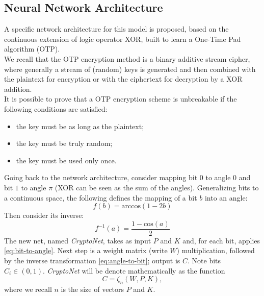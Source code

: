 \documentclass[%
    corpo=11pt,
    twoside,
    stile=classica,
    oldstyle,
    autoretitolo,
    tipotesi=magistrale,
    greek,
    evenboxes,
    english
]{toptesi}
\begin{document}
\subsection{Neural Network Architecture}
A specific network architecture for this model is proposed, based on the continuous extension of logic operator XOR, built to learn a One-Time Pad algorithm (OTP). \\
We recall that the OTP encryption method is a binary additive stream cipher, where generally a stream of (random) keys is generated and then combined with the plaintext for encryption or with the ciphertext for decryption by a XOR addition.\\
It is possible to prove that a OTP encryption scheme is unbreakable if the following conditions are satisfied:
\begin{itemize}
\item the key must be as long as the plaintext;
\item the key must be truly random;
\item the key must be used only once.
\end{itemize}
Going back to the network architecture, consider mapping bit $0$ to angle $0$ and bit $1$ to angle $\pi$ (XOR can be seen as the sum of the angles). Generalizing bits to a continuous space, the following defines the mapping of a bit $b$ into an angle: 
\begin{equation}
\label{eq:bit-to-angle}
f(b) = \text{arccos}(1 - 2b)
\end{equation}
Then consider its inverse:
\begin{equation}
\label{eq:angle-to-bit}
f^{-1}(a) = \frac{1 - \text{cos}(a)}{2}
\end{equation}
The new net, named \textit{CryptoNet}, takes as input $P$ and $K$ and, for each bit, applies \eqref{eq:bit-to-angle}. Next step is a weight matrix (write $W$) multiplication, followed by the inverse transformation \eqref{eq:angle-to-bit}; output is $C$. Note bits $C_i \in (0,1)$. \textit{CryptoNet} will be denote mathematically as the function
\begin{equation}
C = \zeta_n(W, P, K),
\end{equation}
where we recall $n$ is the size of vectors $P$ and $K$.
\end{document}
